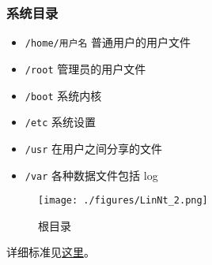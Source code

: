 \subsubsection{系统目录}
\begin{itemize}
\item \verb|/home/用户名| 普通用户的用户文件
\item \verb|/root| 管理员的用户文件
\item \verb|/boot| 系统内核
\item \verb|/etc| 系统设置
\item \verb|/usr| 在用户之间分享的文件
\item \verb|/var| 各种数据文件包括 log
\end{itemize}
\begin{figure}[ht]
\centering
\texttt{[image: ./figures/LinNt\_2.png]}
\caption{根目录} \label{LinNt_fig2}
\end{figure}
详细标准见\href{https://www.pathname.com/fhs/}{这里}。


